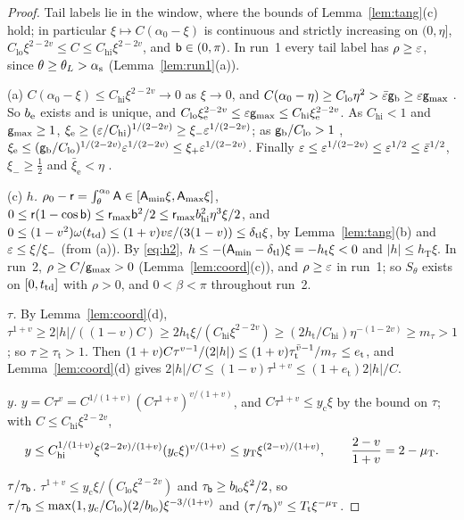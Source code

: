 \begin{proof}
Tail labels lie in the window, where the bounds of Lemma~\ref{lem:tang}(c) hold; in particular $\xi\mapsto C(\alpha_0-\xi)$ is
continuous and strictly increasing on $(0,\eta]$, $C_{\mathrm{lo}}\xi^{2-2v}\le C\le C_{\mathrm{hi}}\xi^{2-2v}$, and
$\mathsf b\in(0,\pi)$. In run~1 every tail label has $\rho\ge\varepsilon$, since $\theta\ge\theta_L>\alpha_{\mathrm s}$ (Lemma~\ref{lem:run1}(a)).

(a) $C(\alpha_0-\xi)\le C_{\mathrm{hi}}\xi^{2-2v}\to0$ as $\xi\to0$, and $C(\alpha_0-\eta)\ge C_{\mathrm{lo}}\eta^2>\bar\varepsilon\mathsf g_{\mathrm b}\ge\varepsilon\mathsf g_{\max}$
. So $b_{\mathrm e}$ exists and is unique, and $C_{\mathrm{lo}}\xi_{\mathrm e}^{2-2v}\le\varepsilon\mathsf g_{\max}\le C_{\mathrm{hi}}\xi_{\mathrm e}^{2-2v}$. As
$C_{\mathrm{hi}}<1$  and $\mathsf g_{\max}\ge1$, $\xi_{\mathrm e}\ge(\varepsilon/C_{\mathrm{hi}})^{1/(2-2v)}\ge\xi_-\varepsilon^{1/(2-2v)}$; as $\mathsf g_{\mathrm b}/C_{\mathrm{lo}}>1$
, $\xi_{\mathrm e}\le(\mathsf g_{\mathrm b}/C_{\mathrm{lo}})^{1/(2-2v)}\varepsilon^{1/(2-2v)}\le\xi_+\varepsilon^{1/(2-2v)}$. Finally
$\varepsilon\le\varepsilon^{1/(2-2v)}\le\varepsilon^{1/2}\le\bar\varepsilon^{1/2}$, $\xi_-\ge\frac12$  and $\bar\xi_{\mathrm e}<\eta$ .

(c) \emph{$h$.} $\rho_0-\mathsf r=\int_\theta^{\alpha_0}\mathsf A\in[\mathsf A_{\min}\xi,\mathsf A_{\max}\xi]$, $0\le\mathsf r(1-\cos\mathsf b)\le\mathsf r_{\max}\mathsf b^2/2\le
\mathsf r_{\max}b_{\mathrm{hi}}^2\eta^3\xi/2$, and $0\le(1-v^2)\omega(t_{\mathrm{td}})\le(1+v)v\varepsilon/(3(1-v))\le\delta_{\mathrm{tl}}\xi$, by
Lemma~\ref{lem:tang}(b) and $\varepsilon\le\xi/\xi_-$ (from (a)). By \eqref{eq:h2}, $h\le-(\mathsf A_{\min}-\delta_{\mathrm{tl}})\xi=-h_{\mathrm t}\xi<0$
 and $|h|\le h_{\mathrm T}\xi$. In run~2, $\rho\ge C/\mathsf g_{\max}>0$ (Lemma~\ref{lem:coord}(c)), and $\rho\ge\varepsilon$ in run~1; so
$S_\theta$ exists on $[0,t_{\mathrm{td}}]$ with $\rho>0$, and $0<\beta<\pi$ throughout run~2.

\emph{$\tau$.} By Lemma~\ref{lem:coord}(d), $\tau^{1+v}\ge2|h|/((1-v)C)\ge2h_{\mathrm t}\xi/(C_{\mathrm{hi}}\xi^{2-2v})\ge
(2h_{\mathrm t}/C_{\mathrm{hi}})\eta^{-(1-2v)}\ge m_\tau>1$ ; so $\tau\ge\tau_{\mathrm t}>1$. Then
$(1+v)C\tau^{v-1}/(2|h|)\le(1+v)\tau_{\mathrm t}^{\bar v-1}/m_\tau\le e_{\mathrm t}$, and Lemma~\ref{lem:coord}(d) gives
$2|h|/C\le(1-v)\tau^{1+v}\le(1+e_{\mathrm t})2|h|/C$.

\emph{$y$.} $y=C\tau^v=C^{1/(1+v)}(C\tau^{1+v})^{v/(1+v)}$, and $C\tau^{1+v}\le y_{\mathrm c}\xi$ by the bound on $\tau$; with
$C\le C_{\mathrm{hi}}\xi^{2-2v}$,
\[
y\le C_{\mathrm{hi}}^{1/(1+v)}\xi^{(2-2v)/(1+v)}(y_{\mathrm c}\xi)^{v/(1+v)}\le y_{\mathrm T}\xi^{(2-v)/(1+v)},\qquad\frac{2-v}{1+v}=2-\mu_{\mathrm T} .
\]

\emph{$\tau/\tau_{\mathsf b}$.} $\tau^{1+v}\le y_{\mathrm c}\xi/(C_{\mathrm{lo}}\xi^{2-2v})$ and $\tau_{\mathsf b}\ge b_{\mathrm{lo}}\xi^2/2$, so
$\tau/\tau_{\mathsf b}\le\max(1,y_{\mathrm c}/C_{\mathrm{lo}})(2/b_{\mathrm{lo}})\xi^{-3/(1+v)}$ and $(\tau/\tau_{\mathsf b})^v\le T_{\mathrm t}\xi^{-\mu_{\mathrm T}}$.


\end{proof}
